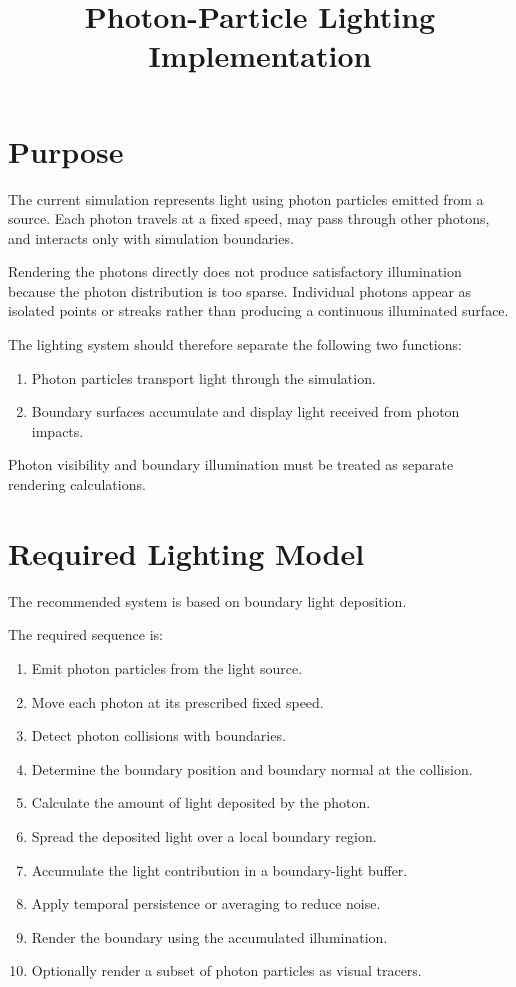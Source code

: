 \documentclass[11pt]{article}
\title{Photon-Particle Lighting Implementation}
\author{}
\date{}
\begin{document}
\maketitle

\section{Purpose}

The current simulation represents light using photon particles emitted from a
source. Each photon travels at a fixed speed, may pass through other photons,
and interacts only with simulation boundaries.

Rendering the photons directly does not produce satisfactory illumination
because the photon distribution is too sparse. Individual photons appear as
isolated points or streaks rather than producing a continuous illuminated
surface.

The lighting system should therefore separate the following two functions:

\begin{enumerate}
    \item Photon particles transport light through the simulation.
    \item Boundary surfaces accumulate and display light received from photon
    impacts.
\end{enumerate}

Photon visibility and boundary illumination must be treated as separate
rendering calculations.

\section{Required Lighting Model}

The recommended system is based on boundary light deposition.

The required sequence is:

\begin{enumerate}
    \item Emit photon particles from the light source.
    \item Move each photon at its prescribed fixed speed.
    \item Detect photon collisions with boundaries.
    \item Determine the boundary position and boundary normal at the collision.
    \item Calculate the amount of light deposited by the photon.
    \item Spread the deposited light over a local boundary region.
    \item Accumulate the light contribution in a boundary-light buffer.
    \item Apply temporal persistence or averaging to reduce noise.
    \item Render the boundary using the accumulated illumination.
    \item Optionally render a subset of photon particles as visual tracers.
\end{enumerate}
\end{document}
